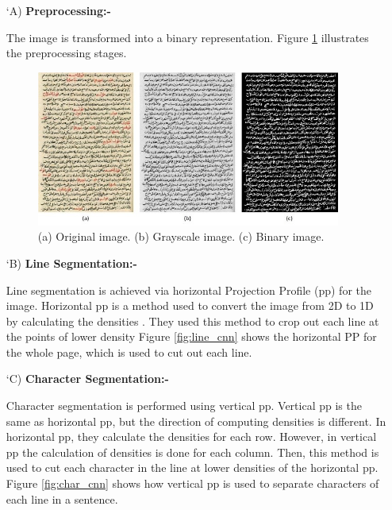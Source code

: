 \begin{itemize}[labelindent=1em,labelsep=0.25cm,leftmargin=*]
        \item[\char `A)] \textbf{Preprocessing:-}
        
        The image is transformed into a binary representation. Figure \ref{fig:pre_cnn} illustrates the preprocessing stages.
        
        \begin{figure}[!htb]
            \centering
            \includegraphics[width=10cm]{images/pre_cnn.png}
            \caption{(a) Original image. (b) Grayscale image. (c) Binary image.}
            \label{fig:pre_cnn}
        \end{figure}
        
        \item[\char `B)] \textbf{Line Segmentation:-} 
        
        Line segmentation is achieved via horizontal Projection Profile (\acrshort{pp}) for the image. Horizontal \acrshort{pp} is a method used to convert the image from 2D to 1D by calculating the densities \cite{PP}. They used this method to crop out each line at the points of lower density Figure \ref{fig:line_cnn} shows the horizontal PP for the whole page, which is used to cut out each line.
        
        \item[\char `C)] \textbf{Character Segmentation:-} 
        
        Character segmentation is performed using vertical \acrshort{pp}. Vertical \acrshort{pp} is the same as horizontal \acrshort{pp}, but the direction of computing densities is different. In horizontal \acrshort{pp}, they calculate the densities for each row. However, in vertical \acrshort{pp} the calculation of densities is done for each column. Then, this method is used to cut each character in the line at lower densities of the horizontal \acrshort{pp}. Figure \ref{fig:char_cnn} shows how vertical \acrshort{pp} is used to  separate characters of each line in a sentence.
        

\end{itemize}
